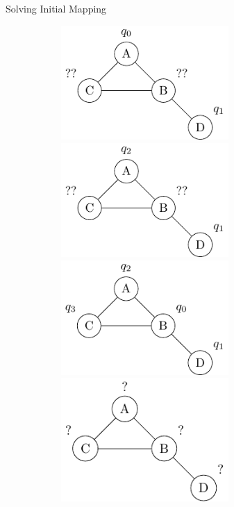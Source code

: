 \documentclass{beamer}
\begin{document}
\begin{frame}{Solving Initial Mapping}
\begin{figure}
\begin{subfigure}[b]{0.35\textwidth}
\begin{overprint}
		\centering
		\includegraphics[width=0.7\textwidth]{figures/partial4}
		\onslide<8>\centering
		\includegraphics[width=0.7\textwidth]{figures/partial5}
		\onslide<9>\centering
		\includegraphics[width=0.7\textwidth]{figures/partial6}
		\onslide<10>\centering
		\includegraphics[width=0.7\textwidth]{figures/partial7}

\end{overprint}
\end{subfigure}
\end{figure}
\end{frame}
\end{document}
